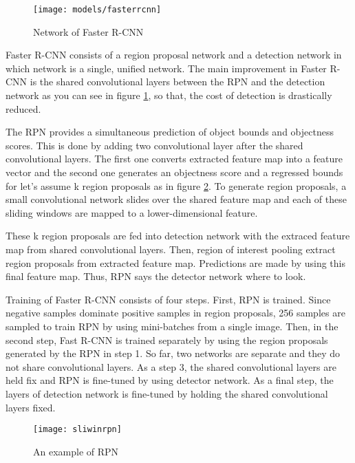 \documentclass{article}
\begin{document}
\setlength{\parindent}{6ex}

\begin{figure}
    \centering
    \texttt{[image: models/fasterrcnn]}
    \caption{Network of Faster R-CNN}
    \label{fig:fasterrcnn1}
\end{figure}

\indent

Faster R-CNN \cite{fasterrcnncite} consists of a region proposal network and a detection network in which 
network is a single, unified network. 
The main improvement in Faster R-CNN is the shared convolutional layers between 
the RPN and the detection network as you can see in figure \ref{fig:fasterrcnn1}, so that, the cost of 
detection is drastically reduced. \par

The RPN provides a simultaneous prediction of object bounds and 
objectness scores. This is done by adding two convolutional layer after the 
shared convolutional layers. The first one converts extracted feature map into a 
feature vector and the second one generates an objectness score and a regressed 
bounds for let's assume k region proposals as in figure \ref{fig:sliwinrpn1}. To 
generate region proposals, a small convolutional network slides over the shared 
feature map and each of these sliding windows are mapped to a lower-dimensional 
feature. \par

These k region proposals are fed into detection network with the extraced feature 
map from shared convolutional layers. Then, region of interest pooling extract 
region proposals from extracted feature map. Predictions are made by using this 
final feature map. Thus, RPN says the detector network where to look. \par

Training of Faster R-CNN consists of four steps. First, RPN is trained. Since 
negative samples dominate positive samples in region proposals, 256 samples are 
sampled to train RPN by using mini-batches from a single image. Then, in the 
second step, Fast R-CNN is trained separately by using the region proposals 
generated by the RPN in step 1. So far, two networks are separate and they do 
not share convolutional layers. As a step 3, the shared convolutional layers are 
held fix and RPN is fine-tuned by using detector network. As a final step, the 
layers of detection network is fine-tuned by holding the shared convolutional layers 
fixed.
\begin{figure}
    \centering
    \texttt{[image: sliwinrpn]}
    \caption{An example of RPN}
    \label{fig:sliwinrpn1}
\end{figure}
\end{document}
